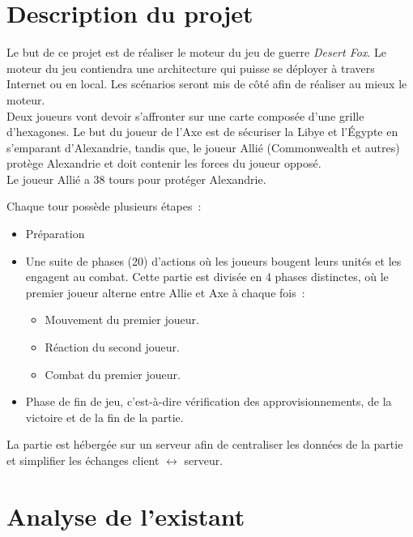 \section{Description du projet}

Le but de ce projet est de réaliser le moteur du jeu de guerre \emph{Desert Fox}.
Le moteur du jeu contiendra une architecture qui puisse se déployer à travers Internet ou en local.
Les scénarios seront mis de côté afin de réaliser au mieux le moteur.\\

Deux joueurs vont devoir s'affronter sur une carte composée d'une grille d'hexagones.
Le but du joueur de l'Axe est de sécuriser la Libye et l'Égypte en s'emparant d'Alexandrie, tandis que, le joueur Allié (Commonwealth et autres) protège Alexandrie et doit contenir les forces du joueur opposé.\\
Le joueur Allié a 38 tours pour protéger Alexandrie.

Chaque tour possède plusieurs étapes :
\begin{itemize}
    \item Préparation
    \item Une suite de phases (20) d'actions où les joueurs bougent leurs unités et les engagent au combat.
          Cette partie est divisée en 4 phases distinctes, où le premier joueur alterne entre Allie et Axe à chaque fois :
          \begin{itemize}
              \item Mouvement du premier joueur.
              \item Réaction du second joueur.
              \item Combat du premier joueur.
          \end{itemize}
    \item Phase de fin de jeu, c'est-à-dire vérification des approvisionnements, de la victoire et de la fin de la partie.
\end{itemize}


La partie est hébergée sur un serveur afin de centraliser les données de la partie et simplifier les échanges client $\leftrightarrow$ serveur.

\section{Analyse de l'existant}

